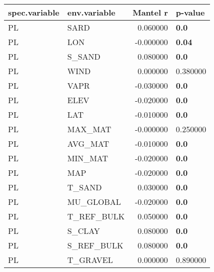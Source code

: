 \begin{tabular}{llrl}
\toprule
spec.variable & env.variable & Mantel r & p-value \\
\midrule
PL & SARD & 0.060000 & \textbf{0.0} \\
PL & LON & -0.000000 & \textbf{0.04} \\
PL & S_SAND & 0.080000 & \textbf{0.0} \\
PL & WIND & 0.000000 & 0.380000 \\
PL & VAPR & -0.030000 & \textbf{0.0} \\
PL & ELEV & -0.020000 & \textbf{0.0} \\
PL & LAT & -0.010000 & \textbf{0.0} \\
PL & MAX_MAT & -0.000000 & 0.250000 \\
PL & AVG_MAT & -0.010000 & \textbf{0.0} \\
PL & MIN_MAT & -0.020000 & \textbf{0.0} \\
PL & MAP & -0.020000 & \textbf{0.0} \\
PL & T_SAND & 0.030000 & \textbf{0.0} \\
PL & MU_GLOBAL & -0.020000 & \textbf{0.0} \\
PL & T_REF_BULK & 0.050000 & \textbf{0.0} \\
PL & S_CLAY & 0.080000 & \textbf{0.0} \\
PL & S_REF_BULK & 0.080000 & \textbf{0.0} \\
PL & T_GRAVEL & 0.000000 & 0.890000 \\
\bottomrule
\end{tabular}
